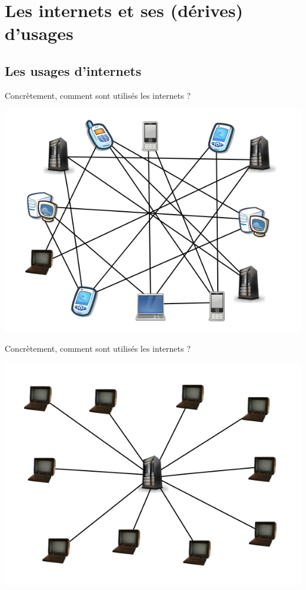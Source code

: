 \section[Les Internets et ses (dérives) d'usages]{Les internets et ses (dérives) d'usages}

\subsection{Les usages d'internets}

\begin{frame}{Concrètement, comment sont utilisés les internets ?}
  \begin{center}
    \includegraphics[height=0.8\textheight]{usages/reseau-bazar.png}
  \end{center}
\end{frame}

\begin{frame}{Concrètement, comment sont utilisés les internets ?}
  \begin{center}
    \includegraphics[height=0.8\textheight]{usages/reseau-etoile.png}
  \end{center}
\end{frame}

